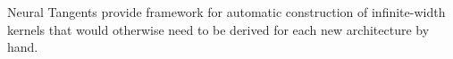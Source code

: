 \documentclass[twoside,11pt]{article}
\begin{document}
Neural Tangents provide framework for automatic construction of infinite-width kernels that would otherwise need to be derived for each new architecture by hand.





\newpage



\end{document}
